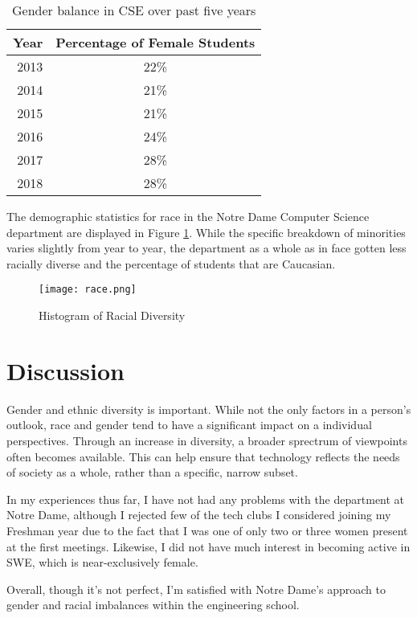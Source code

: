 \documentclass[letterpaper]{article}
\begin{document}
\begin{table}[h!]
    \centering
    \begin{tabular}{r||c}
    Year	& Percentage of Female Students\\
    \hline
    2013	& 22\% \\
    2014	& 21\% \\
    2015	& 21\% \\
    2016	& 24\% \\
    2017 & 28\% \\
    2018 & 28\% \\
    \end{tabular}
    \caption{Gender balance in CSE over past five years}
    \label{tbl:results}
\end{table}

The demographic statistics for race in the Notre Dame Computer Science department are displayed in Figure \ref{fig:race}. While the specific breakdown of minorities varies slightly from year to year, the department as a whole as in face gotten less racially diverse and the percentage of students that are Caucasian.

\begin{figure}[h!]
\centering
\texttt{[image: race.png]}
\caption{Histogram of Racial Diversity}
\label{fig:race}
\end{figure}




\section{Discussion}

Gender and ethnic diversity is important. While not the only factors in a person's outlook, race and gender tend to have a significant impact on a individual perspectives. Through an increase in diversity, a broader sprectrum of viewpoints often becomes available. This can help ensure that technology reflects the needs of society as a whole, rather than a specific, narrow subset.

In my experiences thus far, I have not had any problems with the department at Notre Dame, although I rejected few of the tech clubs I considered joining my Freshman year due to the fact that I was one of only two or three women present at the first meetings. Likewise, I did not have much interest in becoming active in SWE, which is near-exclusively female.

Overall, though it's not perfect, I'm satisfied with Notre Dame's approach to gender and racial imbalances within the engineering school.
\end{document}
